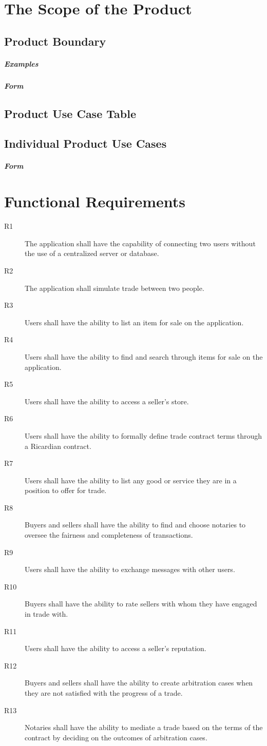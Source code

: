 \documentclass{article}
\begin{document}
\section{The Scope of the Product}
\subsection{Product Boundary}
\subparagraph{Examples}
\subparagraph{Form}

\subsection{Product Use Case Table}

\subsection{Individual Product Use Cases}
\subparagraph{Form}

\section*{Functional Requirements}
\begin{description}
\item[R1]
The application shall have the capability of connecting two users without the use of a centralized server or database.
\item[R2]
The application shall simulate trade between two people.
\item[R3]
Users shall have the ability to list an item for sale on the application.
\item[R4]
Users shall have the ability to find and search through items for sale on the application.
\item[R5]
Users shall have the ability to access a seller's store.
\item[R6]
Users shall have the ability to formally define trade contract terms through a Ricardian contract.
\item[R7]
Users shall have the ability to list any good or service they are in a position to offer for trade.
\item[R8]
Buyers and sellers shall have the ability to find and choose notaries to oversee the fairness and completeness of transactions.
\item[R9]
Users shall have the ability to exchange messages with other users.
\item[R10]
Buyers shall have the ability to rate sellers with whom they have engaged in trade with.
\item[R11]
Users shall have the ability to access a seller's reputation.
\item[R12]
Buyers and sellers shall have the ability to create arbitration cases when they are not satisfied with the progress of a trade.
\item[R13]
Notaries shall have the ability to mediate a trade based on the terms of the contract by deciding on the outcomes of arbitration cases.


\end{description}
\end{document}
